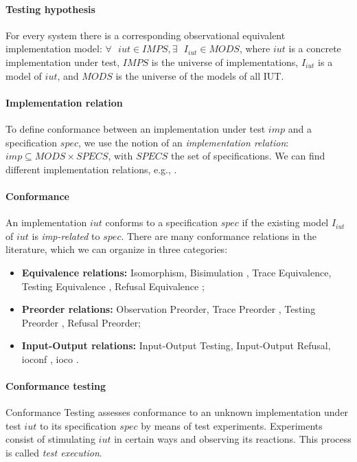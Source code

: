 \paragraph{Testing hypothesis} For every system there is a
corresponding observational equivalent implementation model:
$\forall \text{ } iut \in IMPS, \exists \text{ } I_{iut} \in
MODS$, where $iut$ is a concrete implementation under test,
$IMPS$ is the universe of implementations, $I_{iut}$ is a model
of $iut$, and $MODS$ is the universe of the models of all IUT.

\paragraph{Implementation relation} To define conformance between
an implementation under test $imp$ and a specification $spec$, we
use the notion of an \textit{implementation relation}: $imp
\subseteq MODS \times SPECS$, with $SPECS$ the set of
specifications. We can find different implementation relations,
e.g., \cite{Bri88,phalippou94}.

\paragraph{Conformance} An implementation $iut$ conforms to a
specification $spec$ if the existing model $I_{iut}$ of $iut$ is
\textit{imp-related} to $spec$. There are many conformance
relations in the literature, which we can organize in three
categories:

\begin{itemize}
    \item \textbf{Equivalence relations:} Isomorphism,
        Bisimulation
        \cite{Abdulla06,Fernandez89animplementation}, Trace
        Equivalence, Testing Equivalence \cite{Abramsky1987225},
        Refusal Equivalence \cite{Phillips86};

    \item \textbf{Preorder relations:} Observation Preorder,
        Trace Preorder \cite{DNH84}, Testing Preorder
        \cite{Beohar2015}, Refusal Preorder;

    \item \textbf{Input-Output relations:} Input-Output Testing,
        Input-Output Refusal, ioconf
        \cite{tretmans1996conformance}, ioco \cite{Tre96}.
\end{itemize}

\paragraph{Conformance testing} Conformance Testing assesses
conformance to an unknown implementation under test $iut$ to its
specification $spec$ by means of test experiments. Experiments
consist of stimulating $iut$ in certain ways and observing its
reactions. This process is called \textit{test execution}.

